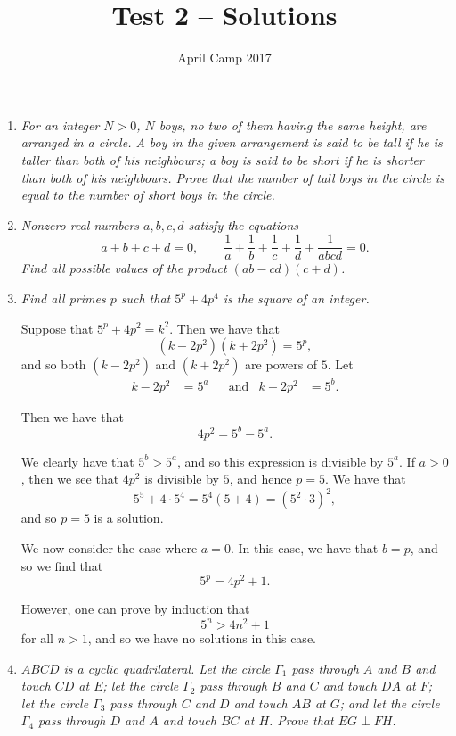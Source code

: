 \documentclass[a4paper,12pt]{article}
\author{April Camp 2017}
\title{Test 2 -- Solutions}
\date{}
\begin{document}
 \maketitle

\begin{enumerate}
	\item 
	\textit{For an integer $N>0$, $N$ boys, no two of them having the same height, are arranged in a circle. A boy in the given arrangement is said to be \emph{tall} if he is taller than both of his neighbours; a boy is said to be \emph{short} if he is shorter than both of his neighbours. Prove that the number of tall boys in the circle is equal to the number of short boys in the circle.}
	
	
		
	\item 
	\textit{Nonzero real numbers $a,b,c,d$ satisfy the equations \[a+b+c+d = 0, \qquad \frac{1}{a}+\frac{1}{b}+\frac{1}{c}+\frac{1}{d}+\frac{1}{abcd} = 0.\]
	Find all possible values of the product $(ab-cd)(c+d)$.}
	
	
	
	\item
	\textit{Find all primes $p$ such that $5^p +4p^4$ is the square of an integer.}
	
Suppose that $5^p + 4p^2 = k^2$. Then we have that
\[
    (k - 2p^2)(k + 2p^2) = 5^p,
\]
and so both $(k - 2p^2)$ and $(k + 2p^2)$ are powers of $5$. Let
\begin{align*}
    k - 2p^2 & = 5^a & & \text{and} & k + 2p^2 & = 5^b.
\end{align*}

Then we have that
\[
    4p^2 = 5^b - 5^a.
\]

We clearly have that $5^b > 5^a$, and so this expression is divisible by $5^a$.
If $a > 0$, then we see that $4p^2$ is divisible by $5$, and hence $p=5$.
We have that
\[
    5^5 + 4\cdot 5^4 = 5^4 (5 + 4) = (5^2 \cdot 3)^2,
\]
and so $p=5$ is a solution.

We now consider the case where $a=0$. In this case, we have that $b=p$, and so
we find that
\[
    5^p = 4p^2 + 1.
\]

However, one can prove by induction that
\[
    5^n > 4n^2 + 1
\]
for all $n > 1$, and so we have no solutions in this case.
	
	\item 
	\textit{$ABCD$ is a cyclic quadrilateral. Let the circle $\Gamma_1$ pass through $A$ and $B$ and touch $CD$ at $E$; let the circle $\Gamma_2$ pass through $B$ and $C$ and touch $DA$ at $F$; let the circle $\Gamma_3$ pass through $C$ and $D$ and touch $AB$ at $G$; and let the circle $\Gamma_4$ pass through $D$ and $A$ and touch $BC$ at $H$. Prove that $EG \perp FH$.}
	

\end{enumerate}
\end{document}
